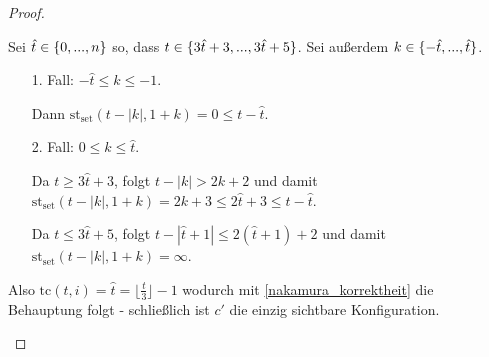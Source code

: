 \begin{proof}
\begin{itemize}
            Sei $\hat{t} \in \{ {0, ..., n} \}$ so, dass
            $t \in \{ {3\hat{t} + 3, ..., 3\hat{t} + 5} \}$.
            Sei außerdem $k \in \{ {-\hat{t}, ..., \hat{t}} \}$.
            
            \begin{itemize}
                \item[1. Fall:] $-\hat{t} \leq k \leq -1$.
                    
                    Dann $\mathrm{st}_{\mathrm{set}}(t-|k|, 1+k) = 0 \leq t - \hat{t}$.
                    
                \item[2. Fall:] $0 \leq k \leq \hat{t}$.
                
                    Da $t \geq 3\hat{t}+3$, folgt $t-|k| > 2k+2$ und
                    damit $\mathrm{st}_{\mathrm{set}}(t-|k|, 1+k) = 2k+3 \leq 2\hat{t} + 3 \leq t - \hat{t}$.
                    
                    Da $t \leq 3\hat{t} + 5$, folgt $t-|\hat{t}+1| \leq 2(\hat{t}+1)+2$ und
                    damit $\mathrm{st}_{\mathrm{set}}(t-|k|, 1+k) = \infty$.
            \end{itemize}
            
            Also $\mathrm{tc}(t, i) = \hat{t} = \lfloor \frac{t}{3} \rfloor - 1$ wodurch mit \cref{nakamura_korrektheit} die Behauptung folgt - schließlich ist $c'$ die einzig sichtbare Konfiguration.
    \end{itemize}
\end{proof}